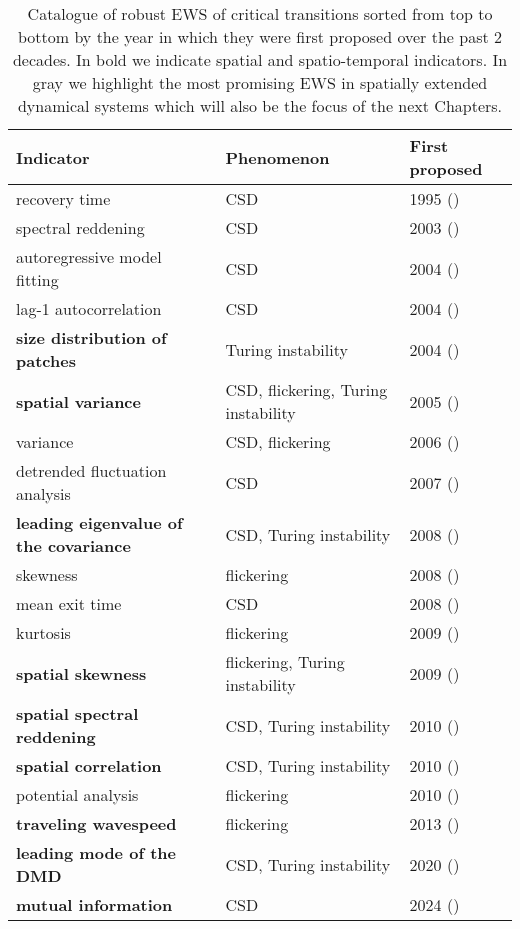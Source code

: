 \documentclass[../main.tex]{subfiles}
\begin{document}
\begin{table}[H]
\centering
\begin{tabular}{|lll|}
 \hline
 Indicator & Phenomenon & First proposed \\
 \hline
 recovery time & CSD & 1995 (\cite{Ives95}) \\
 \rowcolor{lightgray} spectral reddening & CSD & 2003 (\cite{Kleinen03}) \\
 autoregressive model fitting & CSD & 2004 (\cite{Held04}) \\
 \rowcolor{lightgray} lag-1 autocorrelation & CSD & 2004 (\cite{Held04}) \\
 \textbf{size distribution of patches} & Turing instability & 2004 (\cite{Rietkerk04}) \\
 \rowcolor{lightgray} \textbf{spatial variance} & CSD, flickering, Turing instability & 2005 (\cite{Oborny05}) \\
 \rowcolor{lightgray} variance & CSD, flickering & 2006 (\cite{Carpenter06}) \\
 detrended fluctuation analysis & CSD & 2007 (\cite{Livina07}) \\
 \rowcolor{lightgray} \textbf{leading eigenvalue of the covariance} & CSD, Turing instability & 2008 (\cite{Carpenter08}) \\
 skewness & flickering & 2008 (\cite{Guttal08}) \\
 mean exit time & CSD & 2008 (\cite{Guttal08}) \\
 kurtosis & flickering & 2009 (\cite{Biggs09}) \\
 \textbf{spatial skewness} & flickering, Turing instability & 2009 (\cite{Guttal09}) \\
 \rowcolor{lightgray} \textbf{spatial spectral reddening} & CSD, Turing instability & 2010 (\cite{Carpenter10}) \\
 \rowcolor{lightgray} \textbf{spatial correlation} & CSD, \newline Turing instability & 2010 (\cite{Drake10}) \\
 potential analysis & flickering & 2010 (\cite{Livina10}) \\
 \textbf{traveling wavespeed} & flickering & 2013 (\cite{Kuehn13}) \\
 \rowcolor{lightgray} \textbf{leading mode of the DMD} & CSD, Turing instability & 2020 (\cite{Gottwald20}) \\
 \textbf{mutual information} & CSD & 2024 (\cite{Deb24}) \\
 \hline
 \end{tabular}
 \caption{Catalogue of robust EWS of critical transitions sorted from top to bottom by the year in which they were first proposed over the past $2$ decades. In bold we indicate spatial and spatio-temporal indicators. 
 In gray we highlight the most promising EWS in spatially extended dynamical systems which will also be the focus of the next Chapters.}
 \label{tab2.1}
 \end{table}
\end{document}
